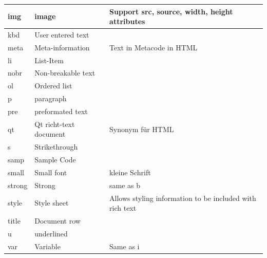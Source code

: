 \begin{longtable}{| p{} | p{} | p{}|}
	\hline img&image& Support src, source, width, height attributes\\
	\hline kbd& User entered text&\\
	\hline meta & Meta-information& Text in Metacode in HTML\\
	\hline li & List-Item&\\
	\hline nobr & Non-breakable text&\\
	\hline ol & Ordered list& \\
	\hline p & paragraph&\\
	\hline pre & preformated text& \\
	\hline qt & Qt richt-text document& Synonym für HTML\\
	\hline s& Strikethrough&\\
	\hline samp & Sample Code&\\
	\hline small & Small font & kleine Schrift\\
	\hline strong & Strong & same as b\\
	\hline style & Style sheet & Allows styling information to be included with rich text\\
	\hline title & Document row & \\
	\hline u & underlined & \\
	\hline var & Variable & Same as i\\
	\hline
\end{longtable}
\clearpage
\newpage
